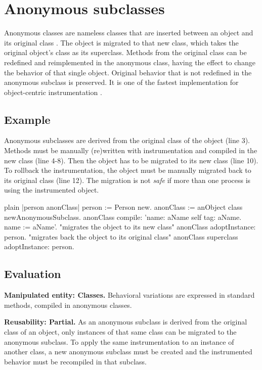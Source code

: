 \documentclass[10pt,twoside,english]{_support/latex/sbabook/sbabook}
\begin{document}
\frontmatter
\pagestyle{plain}

\tableofcontents*
\clearpage\listoffigures

\mainmatter

\chapter{Anonymous subclasses}
Anonymous classes are nameless classes that are inserted between an object and its original class \cite{foote1989reflective,hinkle1993debugging}. The object is migrated to that new class, which takes the original object's class as its superclass. Methods from the original class can be redefined and reimplemented in the anonymous class, having the effect to change the behavior of that single object. Original behavior that is not redefined in the anonymous subclass is preserved. It is one of the fastest implementation for object-centric instrumentation \cite{ducasse1999evaluating}.
\section{Example}
Anonymous subclasses are derived from the original class of the object (line 3). Methods must be manually (re)written with instrumentation and compiled in the new class (line 4-8). Then the object has to be migrated to its new class (line 10). To rollback the instrumentation, the object must be manually migrated back to its original class (line 12). The migration is not \textit{safe} if more than one process is using the instrumented object.

\begin{displaycode}{plain}
|person anonClass|
  person := Person new.
	anonClass := anObject class newAnonymousSubclass.
	anonClass
		compile:
			'name: aName
				self tag: aName.
				name := aName'.
  "migrates the object to its new class"
	anonClass adoptInstance: person.
  "migrates back the object to its original class"
  anonClass superclass adoptInstance: person.
\end{displaycode}
\section{Evaluation}
\textbf{Manipulated entity: Classes.} Behavioral variations are expressed in standard methods, compiled in anonymous classes.

\textbf{Reusability: Partial.} As an anonymous subclass is derived from the original class of an object, only instances of that same class can be migrated to the anonymous subclass. To apply the same instrumentation to an instance of another class, a new anonymous subclass must be created and the instrumented behavior must be recompiled in that subclass.
\end{document}
